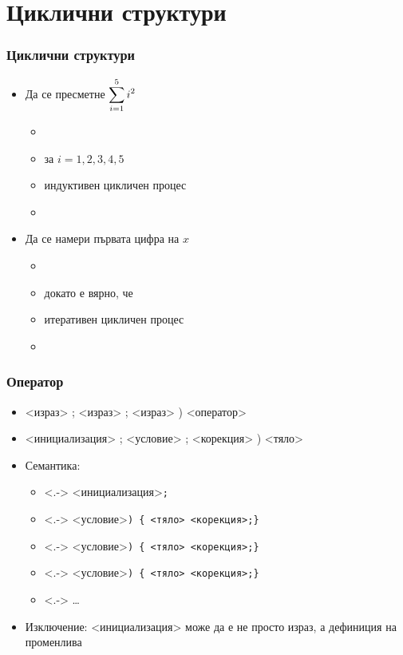 \documentclass{beamer}
\begin{document}
\section{Циклични структури}

\begin{frame}
  \frametitle{Циклични структури}

  \begin{itemize}[<+->]
  \item Да се пресметне $\displaystyle\sum_{i=1}^5\limits i^2$
    \begin{itemize}
    \item {}
    \item {} за $i = 1, 2, 3, 4, 5$
    \item индуктивен цикличен процес
    \item {}
    \end{itemize}
  \item Да се намери първата цифра на $x$
    \begin{itemize}
    \item {}
    \item {} докато е вярно, че 
    \item итеративен цикличен процес
    \item {}
    \end{itemize}
  \end{itemize}
\end{frame}

\begin{frame}
  \frametitle{Оператор }

  \begin{itemize}[<+->]
  \item {}<израз> \tta; <израз> \tta; <израз> \tta) <оператор>
  \item {}<инициализация> \tta; <условие> \tta; <корекция> \tta) <тяло>
  \item Семантика:
    \begin{itemize}
    \item<.-> <инициализация>\tt;
    \item<.-> <условие>\tt{) \{} <тяло> <корекция>\tt{;\}}
    \item<.-> <условие>\tt{) \{} <тяло> <корекция>\tt{;\}}
    \item<.-> <условие>\tt{) \{} <тяло> <корекция>\tt{;\}}
    \item<.-> \ldots
    \end{itemize}
  \item \alert{Изключение:} <инициализация> може да е не просто израз, а дефиниция на променлива
  \end{itemize}
\end{frame}
\end{document}
